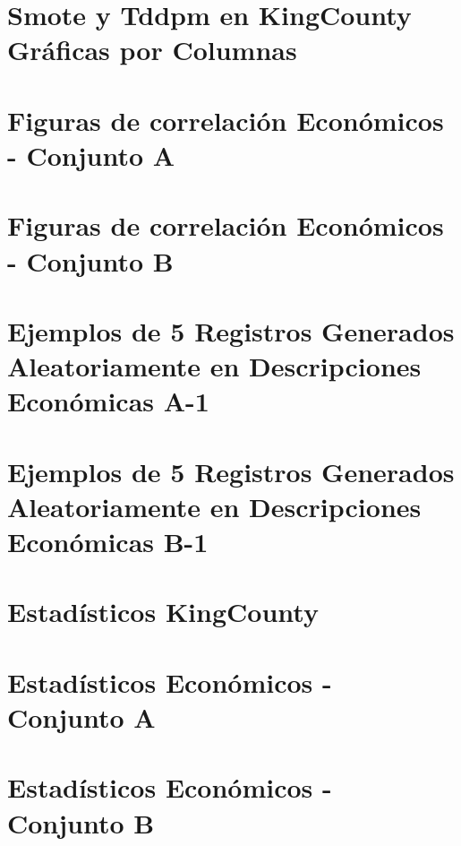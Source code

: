 \section{Smote y Tddpm en KingCounty Gráficas por Columnas}



\section{Figuras de correlación Económicos - Conjunto A}
\label{pairwise-full-a}



\section{Figuras de correlación Económicos - Conjunto B}
\label{pairwise-full-a}


\section{Ejemplos de 5 Registros Generados Aleatoriamente en Descripciones Económicas A-1}
\label{ejemplo-10-aleatoreos-a}


\section{Ejemplos de 5 Registros Generados Aleatoriamente en Descripciones Económicas B-1}
\label{ejemplo-10-aleatoreos-b}


\section{Estadísticos KingCounty}
\label{propiedades-estadisticas-kingCounty}


\section{Estadísticos Económicos - Conjunto A}
\label{propiedades-estadisticas-economicos-A}



\section{Estadísticos Económicos - Conjunto B}
\label{propiedades-estadisticas-economicos-B}


